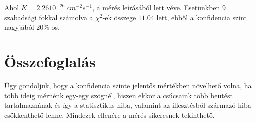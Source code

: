\documentclass[a4paper,12pt]{article}
\begin{document}
\par Ahol $K = 2.26 10^{-26}~cm^{-2}s^{-1}$, a mérés leírásából lett véve. Esetünkben 9 szabadsági fokkal számolva a $\chi^{2}$-ek összege $11.04$ lett, ebből a konfidencia szint nagyjából $20\%$-os.

\section{Összefoglalás}
\par Úgy gondoljuk, hogy a konfidencia szinte jelentős mértékben növelhető volna, ha több ideig mérnénk egy-egy szögnél, hiszen ekkor a csúcsaink több beütést tartalmaznának és így a statisztikus hiba, valamint az illesztésből származó hiba csökkenthető lenne. Mindezek ellenére a mérés sikeresnek tekinthető.
\end{document}
